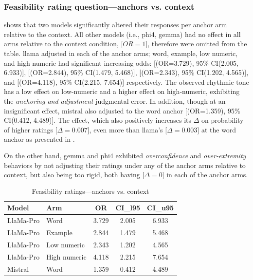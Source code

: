 \documentclass[manuscript,review,anonymous]{acmart}
\begin{document}
\subsubsection{Feasibility rating question—anchors vs. context} \label{subsec:rq3_feas}

 shows that two models significantly altered their responses per anchor arm relative to the context. All other models (i.e., \gls{phi4}, \gls{gemma}) had no effect in all arms relative to the context condition, [$OR = 1$], therefore were omitted from the table. 
\gls{llama} adjusted in each of the anchor arms; word, example, low numeric, and high numeric had significant increasing odds: [(OR=3.729), 95\% CI(2.005, 6.933)], [(OR=2.844), 95\% CI(1.479, 5.468)], [(OR=2.343), 95\% CI(1.202, 4.565)], and [(OR=4.118), 95\% CI(2.215, 7.654)] respectively. The observed rhythmic tone has a low effect on low-numeric and a higher effect on high-numeric, exhibiting the \textit{anchoring and adjustment} judgmental error.  
In addition, though at an insignificant effect, \gls{mistral} also adjusted to the word anchor [(OR=1.359), 95\% CI(0.412, 4.489)]. The effect, which also positively increases its $\Delta$ on probability of higher ratings [$\Delta=0.007$], even more than \gls{llama}'s [$\Delta=0.003$] at the word anchor as presented in .

On the other hand, \gls{gemma} and \gls{phi4} exhibited \textit{overconfidence} and \textit{over-extremity} behaviors by not adjusting their ratings under any of the anchor arms relative to context, but also being too rigid, both having [$\Delta=0$] in each of the anchor arms. 

\begin{table}
  \caption{Feasibility ratings—anchors vs. context}
  \label{tab:rq3_feas_or_anchors_vs_context}
  \centering
  \begin{tabular}{llccc}
    \toprule
    Model & Arm         & OR & CI\_l95 & CI\_u95 \\
    \midrule
    LlaMa-Pro & Word          & 3.729 & 2.005 & 6.933 \\
    LlaMa-Pro & Example       & 2.844 & 1.479 & 5.468 \\
    LlaMa-Pro & Low numeric   & 2.343 & 1.202 & 4.565 \\
    LlaMa-Pro & High numeric  & 4.118 & 2.215 & 7.654 \\
    Mistral   & Word          & 1.359 & 0.412 & 4.489 \\
    \bottomrule
  \end{tabular}
\end{table}
\end{document}
